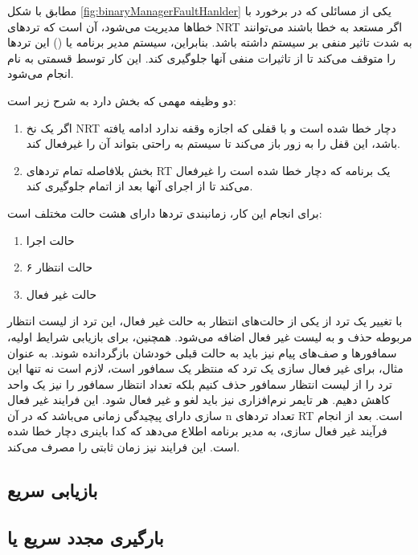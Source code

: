 \documentclass[10pt, a4paper]{article}
\begin{document}
مطابق با شکل \ref{fig:binaryManagerFaultHanlder} یکی از مسائلی که در برخورد با
خطا‌ها مدیریت می‌شود، آن است که ترد‌های NRT اگر مستعد به خطا باشند می‌توانند به
شدت تاثیر منفی بر سیستم داشته باشد. بنابراین، سیستم مدیر برنامه یا () این ترد‌ها را متوقف می‌کند تا از تاثیرات منفی آنها جلوگیری کند. این
کار توسط قسمتی به نام  انجام می‌شود.

دو وظیفه مهمی که بخش  دارد به شرح زیر است:

\begin{enumerate}
    \item اگر یک نخ NRT دچار خطا شده است و با قفلی که اجازه وقفه ندارد ادامه
    یافته باشد، این قفل را به زور باز می‌کند تا سیستم به راحتی بتواند آن را
    غیرفعال کند.
    \item بخش  بلافاصله تمام ترد‌های RT یک برنامه که دچار خطا
    شده است را غیرفعال می‌کند تا از اجرای آنها بعد از اتمام  جلوگیری کند.
\end{enumerate}

برای انجام این کار، زمانبندی ترد‌ها دارای هشت حالت مختلف است:

\begin{enumerate}
    \item حالت اجرا
    \item ۶ حالت انتظار
    \item حالت غیر فعال
\end{enumerate}

با تغییر یک ترد از یکی از حالت‌های انتظار به حالت غیر فعال، این ترد از لیست
انتظار مربوطه حذف و به لیست غیر فعال اضافه می‌شود. همچنین، برای بازیابی شرایط
اولیه، سمافور‌ها و صف‌های پیام نیز باید به حالت قبلی خودشان بازگردانده شوند. به
عنوان مثال، برای غیر فعال سازی یک ترد که منتظر یک سمافور است، لازم است نه تنها
این ترد را از لیست انتظار سمافور حذف کنیم بلکه تعداد انتظار سمافور را نیز یک
واحد کاهش دهیم. هر تایمر نرم‌افزاری نیز باید لغو و غیر فعال شود. این فرایند غیر
فعال سازی دارای پیچیدگی زمانی  می‌باشد که در آن n تعداد ترد‌های RT است.
بعد از انجام فرآیند غیر فعال سازی،  به مدیر برنامه اطلاع
می‌دهد که کدا باینری دچار خطا شده است. این فرایند نیز زمان ثابتی را مصرف می‌کند.

\subsection{بازیابی سریع}

\subsection{بارگیری مجدد سریع یا }
\end{document}

